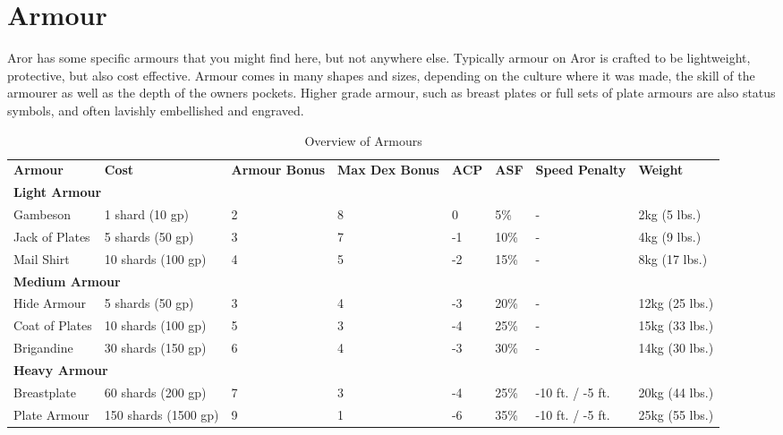 \section{Armour}
\label{sec:Armour}

Aror has some specific armours that you might find here, but not anywhere
else.  Typically armour on Aror is crafted to be lightweight, protective, but
also cost effective. Armour comes in many shapes and sizes, depending on the
culture where it was made, the skill of the armourer as well as the depth of
the owners pockets. Higher grade armour, such as breast plates or full sets of
plate armours are also status symbols, and often lavishly embellished and
engraved.

\begin{table*}[!htb]
  \caption{Overview of Armours}
  \begin{tabular}{p{3cm} l p{1cm} p{1.5cm} l l p{1cm} l}
    \textbf{Armour} & \textbf{Cost} & \textbf{Armour Bonus} & \textbf{Max Dex Bonus} & \textbf{ACP} & \textbf{ASF} & \textbf{Speed Penalty} & \textbf{Weight} \\
    \multicolumn{8}{l}{\large{\textbf{Light Armour}}} \\
    Gambeson        &   1 shard   (10 gp)  & 2 & 8 &  0 &  5\% & -                  &  2kg  (5 lbs.) \\
    Jack of Plates  &   5 shards  (50 gp)  & 3 & 7 & -1 & 10\% & -                  &  4kg  (9 lbs.) \\
    Mail Shirt      &  10 shards  (100 gp) & 4 & 5 & -2 & 15\% & -                  &  8kg (17 lbs.) \\
    \multicolumn{8}{l}{\large{\textbf{Medium Armour}}} \\
    Hide Armour     &   5 shards  (50 gp)  & 3 & 4 & -3 & 20\% & -                  & 12kg (25 lbs.) \\
    Coat of Plates  &  10 shards  (100 gp) & 5 & 3 & -4 & 25\% & -                  & 15kg (33 lbs.) \\
    Brigandine      &  30 shards  (150 gp) & 6 & 4 & -3 & 30\% & -                  & 14kg (30 lbs.) \\
    \multicolumn{8}{l}{\large{\textbf{Heavy Armour}}} \\
    Breastplate     &  60 shards  (200 gp) & 7 & 3 & -4 & 25\% & -10 ft. / -5 ft.   & 20kg (44 lbs.) \\
    Plate Armour    & 150 shards (1500 gp) & 9 & 1 & -6 & 35\% & -10 ft. / -5 ft.   & 25kg (55 lbs.) \\
  \end{tabular}
\end{table*}

